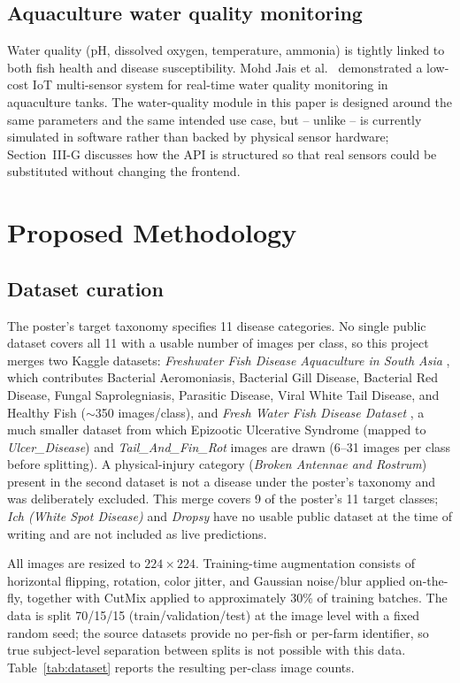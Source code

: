 \documentclass[conference]{IEEEtran}
\begin{document}
\subsection{Aquaculture water quality monitoring}
Water quality (pH, dissolved oxygen, temperature, ammonia) is tightly linked to both fish health and disease susceptibility. Mohd Jais et al.\ \cite{mohdjais2024} demonstrated a low-cost IoT multi-sensor system for real-time water quality monitoring in aquaculture tanks. The water-quality module in this paper is designed around the same parameters and the same intended use case, but -- unlike \cite{mohdjais2024} -- is currently simulated in software rather than backed by physical sensor hardware; Section~III-G discusses how the API is structured so that real sensors could be substituted without changing the frontend.

\section{Proposed Methodology}

\subsection{Dataset curation}
The poster's target taxonomy specifies 11 disease categories. No single public dataset covers all 11 with a usable number of images per class, so this project merges two Kaggle datasets: \emph{Freshwater Fish Disease Aquaculture in South Asia} \cite{kaggle-subirbiswas19}, which contributes Bacterial Aeromoniasis, Bacterial Gill Disease, Bacterial Red Disease, Fungal Saprolegniasis, Parasitic Disease, Viral White Tail Disease, and Healthy Fish ($\sim$350 images/class), and \emph{Fresh Water Fish Disease Dataset} \cite{kaggle-utpolkantidas}, a much smaller dataset from which Epizootic Ulcerative Syndrome (mapped to \emph{Ulcer\_Disease}) and \emph{Tail\_And\_Fin\_Rot} images are drawn (6--31 images per class before splitting). A physical-injury category (\emph{Broken Antennae and Rostrum}) present in the second dataset is not a disease under the poster's taxonomy and was deliberately excluded. This merge covers 9 of the poster's 11 target classes; \emph{Ich (White Spot Disease)} and \emph{Dropsy} have no usable public dataset at the time of writing and are not included as live predictions.

All images are resized to $224\times224$. Training-time augmentation consists of horizontal flipping, rotation, color jitter, and Gaussian noise/blur applied on-the-fly, together with CutMix applied to approximately 30\% of training batches. The data is split 70/15/15 (train/validation/test) at the image level with a fixed random seed; the source datasets provide no per-fish or per-farm identifier, so true subject-level separation between splits is not possible with this data. Table~\ref{tab:dataset} reports the resulting per-class image counts.
\end{document}
